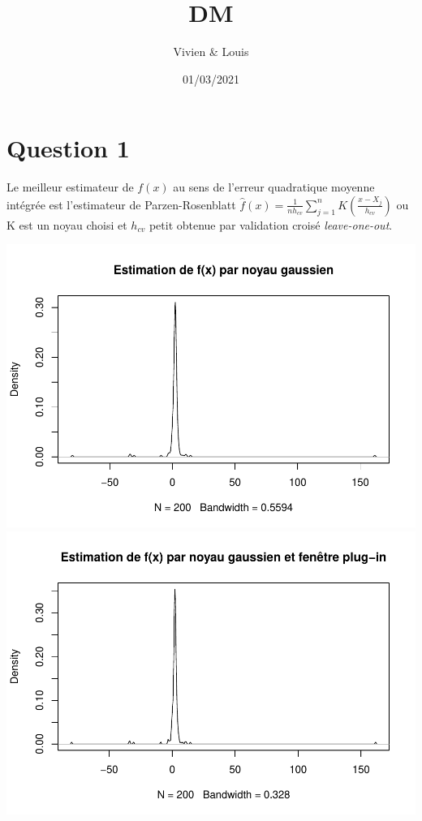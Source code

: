 \documentclass[
]{article}
\title{DM}
\author{Vivien \& Louis}
\date{01/03/2021}
\begin{document}
\maketitle

\hypertarget{question-1}{%
\section{Question 1}\label{question-1}}

Le meilleur estimateur de \({f}(x)\) au sens de l'erreur quadratique
moyenne intégrée est l'estimateur de Parzen-Rosenblatt
\(\hat{f}(x) = \frac{1}{nh_{cv}}\sum_{j=1}^{n}K(\frac{x-X_{j}}{h_{cv}})\)
ou K est un noyau choisi et \(h_{cv}\) petit obtenue par validation
croisé \emph{leave-one-out}.

\includegraphics{DM_files/figure-latex/unnamed-chunk-2-1.pdf}
\includegraphics{DM_files/figure-latex/unnamed-chunk-2-2.pdf}
\end{document}
